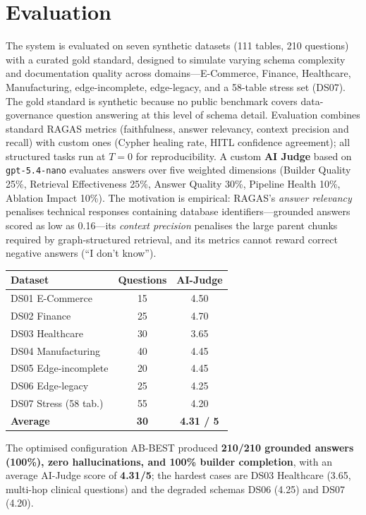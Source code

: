 \documentclass[11pt,a4paper]{article}
\begin{document}
\section{Evaluation}

The system is evaluated on seven synthetic datasets (111 tables, 210 questions) with a curated gold standard, designed to simulate varying schema complexity and documentation quality across domains---E-Commerce, Finance, Healthcare, Manufacturing, edge-incomplete, edge-legacy, and a 58-table stress set (DS07). The gold standard is synthetic because no public benchmark covers data-governance question answering at this level of schema detail. Evaluation combines standard RAGAS metrics (faithfulness, answer relevancy, context precision and recall) with custom ones (Cypher healing rate, HITL confidence agreement); all structured tasks run at $T{=}0$ for reproducibility. A custom \textbf{AI Judge} based on \texttt{gpt-5.4-nano} evaluates answers over five weighted dimensions (Builder Quality 25\%, Retrieval Effectiveness 25\%, Answer Quality 30\%, Pipeline Health 10\%, Ablation Impact 10\%). The motivation is empirical: RAGAS's \emph{answer relevancy} penalises technical responses containing database identifiers---grounded answers scored as low as 0.16---its \emph{context precision} penalises the large parent chunks required by graph-structured retrieval, and its metrics cannot reward correct negative answers (``I don't know'').

\begin{center}
\small
\begin{tabular}{@{}lcc@{}}
\toprule
\textbf{Dataset} & \textbf{Questions} & \textbf{AI-Judge} \\
\midrule
DS01 E-Commerce       & 15 & 4.50 \\
DS02 Finance          & 25 & 4.70 \\
DS03 Healthcare       & 30 & 3.65 \\
DS04 Manufacturing    & 40 & 4.45 \\
DS05 Edge-incomplete  & 20 & 4.45 \\
DS06 Edge-legacy      & 25 & 4.25 \\
DS07 Stress (58 tab.) & 55 & 4.20 \\
\midrule
\textbf{Average}      & \textbf{30} & \textbf{4.31 / 5} \\
\bottomrule
\end{tabular}
\end{center}

The optimised configuration AB-BEST produced \textbf{210/210 grounded answers (100\%), zero hallucinations, and 100\% builder completion}, with an average AI-Judge score of \textbf{4.31/5}; the hardest cases are DS03 Healthcare (3.65, multi-hop clinical questions) and the degraded schemas DS06 (4.25) and DS07 (4.20).
\end{document}
